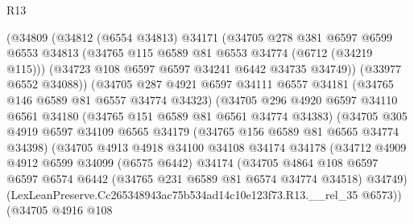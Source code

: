 \begin{lexlean}{R13}
\begin{coremodule}
                    (@34809
                      (@34812
                        (@6554 @34813)
                        @34171
                        (@34705
                          @278
                          @381
                          @6597
                          @6599
                          @6553
                          @34813
                          (@34765 @115 @6589 @81 @6553 @34774 (@6712 (@34219 @115)))
                          (@34723 @108 @6597 @6597 @34241 @6442 @34735 @34749))
                        (@33977 @6552 @34088))
                      (@34705
                        @287
                        @4921
                        @6597
                        @34111
                        @6557
                        @34181
                        (@34765 @146 @6589 @81 @6557 @34774 @34323)
                        (@34705
                          @296
                          @4920
                          @6597
                          @34110
                          @6561
                          @34180
                          (@34765 @151 @6589 @81 @6561 @34774 @34383)
                          (@34705
                            @305
                            @4919
                            @6597
                            @34109
                            @6565
                            @34179
                            (@34765 @156 @6589 @81 @6565 @34774 @34398)
                            (@34705
                              @4913
                              @4918
                              @34100
                              @34108
                              @34174
                              @34178
                              (@34712
                                @4909
                                @4912
                                @6599
                                @34099
                                (@6575 @6442)
                                @34174
                                (@34705
                                  @4864
                                  @108
                                  @6597
                                  @6597
                                  @6574
                                  @6442
                                  (@34765 @231 @6589 @81 @6574 @34774 @34518)
                                  @34749)
                                (LexLeanPreserve.Cc265348943ac75b534ad14c10e123f73.R13.__rel_35
                                  @6573))
                              (@34705
                                @4916
                                @108

\end{coremodule}
\end{lexlean}
